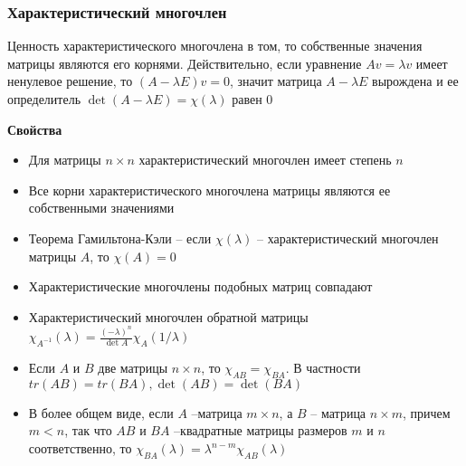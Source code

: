 \documentclass{article}
\begin{document}

\subsubsection{Характеристический многочлен}


Ценность характеристического многочлена в том, то собственные значения матрицы являются его корнями. Действительно, если уравнение $Av = \lambda v$ имеет ненулевое решение, то $(A - \lambda E)v = 0$, значит матрица $A - \lambda E$ вырождена и ее определитель $\det (A - \lambda E) = \chi(\lambda)$ равен 0

{\bf Свойства}

\begin{itemize}
	\item Для матрицы $n \times n$ характеристический многочлен имеет степень $n$
	\item Все корни характеристического многочлена матрицы являются ее собственными значениями
	\item Теорема Гамильтона-Кэли -- если $\chi(\lambda)$ -- характеристический многочлен матрицы $A$, то $\chi(A) = 0$
	\item Характеристические многочлены подобных матриц совпадают
	\item Характеристический многочлен обратной матрицы $\chi_{A^{-1}}(\lambda) = \frac{(-\lambda)^n}{\det A}\chi_A(1/\lambda)$
	\item Если $A$ и $B$ две матрицы $n \times n$, то $\chi_{AB} = \chi_{BA}$. В частности $tr(AB) = tr(BA), \det(AB) = \det (BA)$
	\item В более общем виде, если $A$ --матрица $m \times n$, а $B$ -- матрица $n \times m$, причем $m < n$, так что $AB$ и $BA$ --квадратные матрицы размеров $m$ и $n$ соответственно, то $\chi_{BA}(\lambda) = \lambda ^{n - m}\chi_{AB}(\lambda)$ 
\end{itemize}
\end{document}
